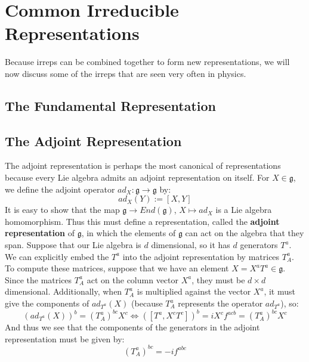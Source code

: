 \documentclass[11pt, oneside]{article}   	%
\theoremstyle{definition}
\begin{document}
\section{Common Irreducible Representations}

Because irreps can be combined together to form new representations, we will now discuss some of the 
irreps that are seen very often in physics. 

\subsection{The Fundamental Representation}

\subsection{The Adjoint Representation}

The adjoint representation is perhaps the most canonical of representations because every Lie 
algebra admits an adjoint representation on itself. For $X\in\mathfrak g$, we define the adjoint 
operator $ad_X : \mathfrak g\rightarrow\mathfrak g$ by:
\begin{equation}
	ad_X(Y) := [X, Y]
\end{equation}
It is easy to show that the map $\mathfrak g\rightarrow End(\mathfrak g)$, $X\mapsto ad_X$ is a 
Lie algebra homomorphism. Thus this must define a representation, called the \textbf{adjoint 
representation} of $\mathfrak g$, in which the elements of $\mathfrak g$ can act on the algebra 
that they span. Suppose that our Lie algebra is $d$ dimensional, so it has $d$ generators $T^a$. 
We can explicitly embed the $T^a$ into the adjoint representation by matrices $T_A^a$. To 
compute these matrices, suppose that we have an element $X = X^a T^a\in\mathfrak g$. Since the 
matrices $T_A^a$ act on the column vector $X^a$, they must be $d\times d$ dimensional. Additionally, 
when $T_A^a$ is multiplied against the vector $X^a$, it must give the components of 
$ad_{T^a}(X)$ (because $T^a_A$ represents the operator $ad_{T^a}$), so:
\begin{equation}
	(ad_{T^a}(X))^b = (T_A^a)^{bc} X^c\iff ([T^a, X^c T^c])^b = iX^c f^{acb} = (T_A^a)^{bc} X^c
\end{equation}
And thus we see that the components of the generators in the adjoint representation must be given by:
\begin{equation}
	(T_A^a)^{bc} = -if^{abc}
\end{equation}
\end{document}
